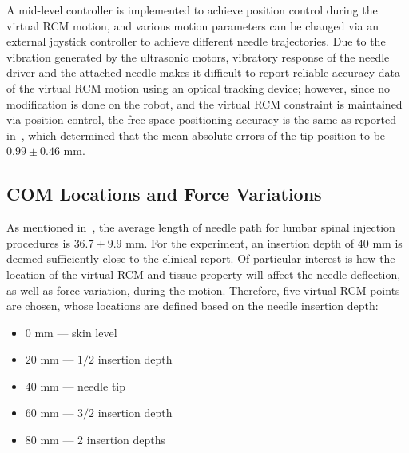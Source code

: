
A mid-level controller is implemented to achieve position control during the virtual RCM motion, and various motion parameters can be changed via an external joystick controller to achieve different needle trajectories. Due to the vibration generated by the ultrasonic motors, vibratory response of the needle driver and the attached needle makes it difficult to report reliable accuracy data of the virtual RCM motion using an optical tracking device; however, since no modification is done on the robot, and the virtual RCM constraint is maintained via position control,  the free space positioning accuracy is the same as reported in~\parencite{liFullyActuatedBodyMounted2020a}, which determined that the mean absolute errors of the tip position to be $0.99 \pm 0.46$ mm.

\subsection{COM Locations and Force Variations} 
\label{sec:chap-2-com-and-force}
As mentioned in~\parencite{fritzAugmentedRealityVisualization2012}, the average length of needle path for lumbar spinal injection procedures is $36.7\pm9.9$ mm. For the experiment, an insertion depth of $40$ mm is deemed sufficiently close to the clinical report. Of particular interest is how the location of the virtual RCM and tissue property will affect the needle deflection, as well as force variation, during the motion. Therefore, five virtual RCM points are chosen, whose locations are defined based on the needle insertion depth:

\begin{itemize}
  \item $0$ mm --- skin level
  \item $20$ mm --- $1/2$ insertion depth
  \item $40$ mm --- needle tip
  \item $60$ mm --- $3/2$ insertion depth
  \item $80$ mm --- 2 insertion depths
\end{itemize}

